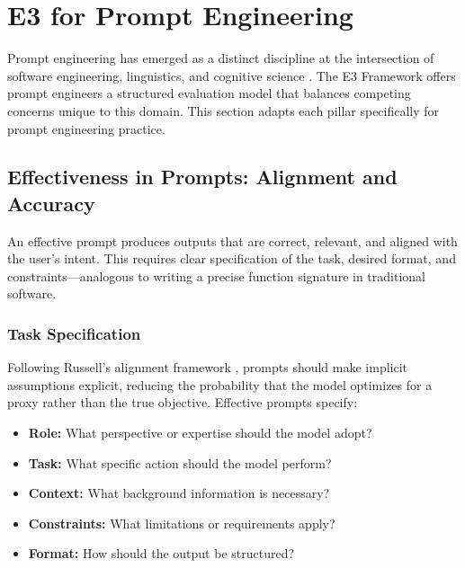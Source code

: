 \documentclass[11pt,a4paper]{article}
\begin{document}


\section{E3 for Prompt Engineering}

Prompt engineering has emerged as a distinct discipline at the intersection of software engineering, linguistics, and cognitive science \cite{brown2020language, wei2022chain}. The E3 Framework offers prompt engineers a structured evaluation model that balances competing concerns unique to this domain. This section adapts each pillar specifically for prompt engineering practice.

\subsection{Effectiveness in Prompts: Alignment and Accuracy}

An effective prompt produces outputs that are correct, relevant, and aligned with the user's intent. This requires clear specification of the task, desired format, and constraints---analogous to writing a precise function signature in traditional software.

\subsubsection{Task Specification}

Following Russell's alignment framework \cite{russell2019human}, prompts should make implicit assumptions explicit, reducing the probability that the model optimizes for a proxy rather than the true objective. Effective prompts specify:

\begin{itemize}[leftmargin=2em]
    \item \textbf{Role:} What perspective or expertise should the model adopt?
    \item \textbf{Task:} What specific action should the model perform?
    \item \textbf{Context:} What background information is necessary?
    \item \textbf{Constraints:} What limitations or requirements apply?
    \item \textbf{Format:} How should the output be structured?
\end{itemize}
\end{document}
